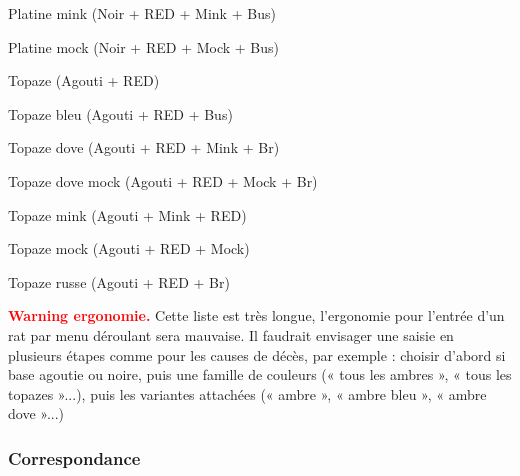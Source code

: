\documentclass[a4paper,10pt]{article}
\newcommand\desire[1]{\noindent\textbf{\textcolor{red}{#1}}}
\begin{document}
Platine mink (Noir + RED + Mink + Bus)
 
Platine mock (Noir + RED + Mock + Bus)
 
Topaze (Agouti + RED)
 
Topaze bleu (Agouti + RED + Bus)
 
Topaze dove (Agouti + RED + Mink + Br)
 
Topaze dove mock (Agouti + RED + Mock + Br)
 
Topaze mink (Agouti + Mink + RED)
 
Topaze mock (Agouti + RED + Mock)
 
Topaze russe (Agouti + RED + Br)

\desire{Warning ergonomie.} Cette liste est très longue, l'ergonomie pour l'entrée d'un rat par menu déroulant sera mauvaise. Il faudrait envisager une saisie en plusieurs étapes comme pour les causes de décès, par exemple : choisir d'abord si base agoutie ou noire, puis une famille de couleurs (« tous les ambres », « tous les topazes »...), puis les variantes attachées (« ambre », « ambre bleu », « ambre dove »...)         

\subsubsection{Correspondance}
\end{document}
